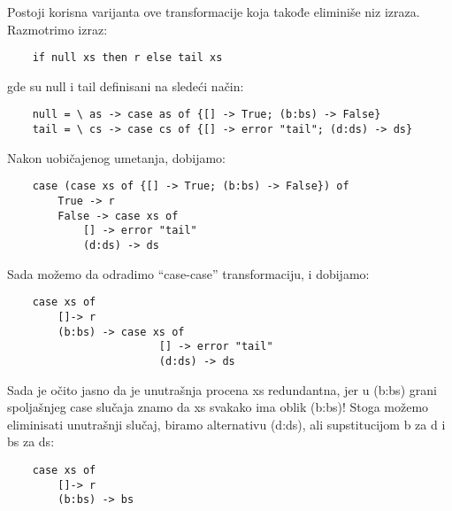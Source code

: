 Postoji korisna varijanta ove transformacije koja takođe eliminiše niz izraza. Razmotrimo izraz:
\begin{verbatim}
	if null xs then r else tail xs
\end{verbatim}
gde su null i tail definisani na sledeći način:
\begin{verbatim}
	null = \ as -> case as of {[] -> True; (b:bs) -> False}
	tail = \ cs -> case cs of {[] -> error "tail"; (d:ds) -> ds}
\end{verbatim}
Nakon uobičajenog umetanja, dobijamo:
\begin{verbatim}
	case (case xs of {[] -> True; (b:bs) -> False}) of
		True -> r
		False -> case xs of
			[] -> error "tail"
			(d:ds) -> ds
\end{verbatim}
Sada možemo da odradimo “case-case” transformaciju, i dobijamo:
\begin{verbatim}
	case xs of
		[]-> r
		(b:bs) -> case xs of
						[] -> error "tail"
						(d:ds) -> ds
\end{verbatim}
Sada je očito jasno da je unutrašnja procena xs redundantna, jer u (b:bs) grani spoljašnjeg case slučaja znamo da xs svakako ima 
oblik (b:bs)! Stoga možemo eliminisati unutrašnji slučaj, biramo alternativu (d:ds), ali supstitucijom b za d i bs za ds: 
\begin{verbatim}
	case xs of
		[]-> r
		(b:bs) -> bs
\end{verbatim}

